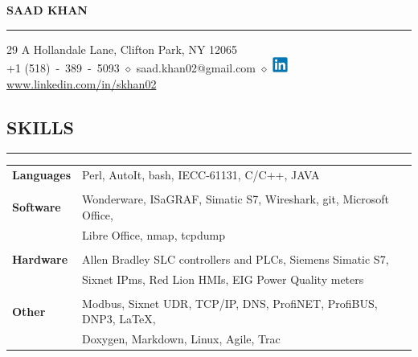 \documentclass{article}
\begin{document}
%
\begin{center}
    {\MakeUppercase{\huge\bf Saad Khan}} \\
    \bigskip
    \hrule
    \bigskip
    29 A Hollandale Lane, Clifton Park, NY 12065 \\
    +1 (518)~-~389~-~5093
    $\diamond$
    saad.khan02@gmail.com
    $\diamond$
    \href{https://www.linkedin.com/in/skhan02}
         {\includegraphics[width=5mm]{linkedin.png} www.linkedin.com/in/skhan02}
    \\
    \bigskip
\end{center}

%
\subsection*{\MakeUppercase{\bf Skills}}
    \hrule
    \bigskip
    \begin{tabular}{l l}
    {\bfseries Languages} &
    Perl, AutoIt, bash, IECC-61131, C/C++, JAVA\\
    \\
    {\bfseries Software} &
    Wonderware, ISaGRAF, Simatic S7, Wireshark, git, Microsoft Office,\\
    &
    Libre Office, nmap, tcpdump \\
    \\
    {\bfseries Hardware} &
    Allen Bradley SLC controllers and PLCs, Siemens Simatic S7,\\
    &
    Sixnet IPms, Red Lion HMIs, EIG Power Quality meters \\
    \\
    {\bfseries Other} &
    Modbus, Sixnet UDR, TCP/IP, DNS, ProfiNET, ProfiBUS, DNP3, \LaTeX, \\
    &
    Doxygen, Markdown, Linux, Agile, Trac \\
    \end{tabular}
    \bigskip

%
\end{document}
